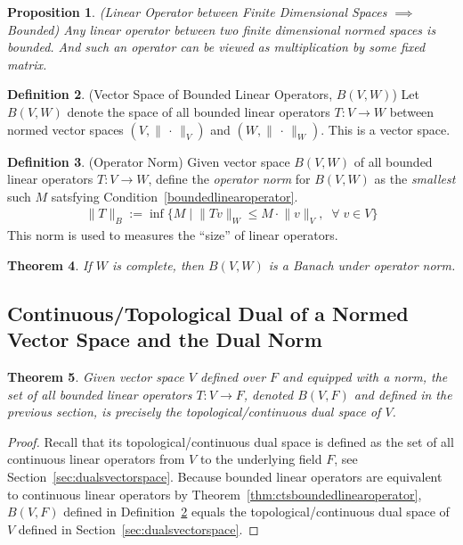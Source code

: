 \documentclass[12pt]{book}
\numberwithin{equation}{section} %
\theoremstyle{plain}
\newtheorem{thm}{Theorem}[section]
\newtheorem{prop}[thm]{Proposition}
\theoremstyle{definition}
\newtheorem{defn}[thm]{Definition}
\theoremstyle{remark}
\newcommand{\ra}{\rightarrow}
\begin{document}
\begin{prop}
\label{prop:finitedimbddlinearoperator}
\emph{(Linear Operator between Finite Dimensional Spaces $\implies$
Bounded)}
Any linear operator between two finite dimensional normed spaces
is bounded.
And such an operator can be viewed as multiplication by some fixed
matrix.
\end{prop}


\begin{defn}
\label{defn:BVW}
({Vector Space of Bounded Linear Operators, $B(V,W)$})
Let $B(V,W)$ denote the space of all bounded linear operators
$T:V\ra W$
between normed vector spaces
$(V,\lVert\,\cdot\,\rVert_V)$
and
$(W,\lVert\,\cdot\,\rVert_W)$.
This is a vector space.
\end{defn}


\begin{defn}(Operator Norm)
Given vector space $B(V,W)$ of all bounded linear operators $T:V\ra W$,
define the \emph{operator norm} for $B(V,W)$ as the \emph{smallest} such
$M$ satsfying Condition~\ref{boundedlinearoperator}.
\begin{align*}
  \lVert T\rVert_B
  :=
  \inf
  \big\{
    M
    \;\big|\;
    \lVert Tv\rVert_W
    \leq
    M
    \cdot
    \lVert v\rVert_V,
    \;\;
    \forall \; v\in V
  \big\}
\end{align*}
This norm is used to measures the ``size'' of linear operators.
\end{defn}


\begin{thm}
If $W$ is complete, then $B(V,W)$ is a Banach under operator norm.
\end{thm}


\clearpage
\subsection{%
  Continuous/Topological Dual of a Normed Vector Space and the Dual Norm
}
\label{sec:dualnormed}


\begin{thm}
Given vector space $V$ defined over $F$ and equipped with a norm,
the set of all bounded linear operators $T:V\ra F$, denoted $B(V,F)$ and
defined in the previous section, is precisely the topological/continuous
dual space of $V$.
\end{thm}
\begin{proof}
Recall that its topological/continuous dual space is defined as the set
of all continuous linear operators from $V$ to the underlying field $F$,
see Section~\ref{sec:dualsvectorspace}.
Because bounded linear operators are equivalent to continuous linear
operators by Theorem~\ref{thm:ctsboundedlinearoperator},
$B(V,F)$ defined in Definition~\ref{defn:BVW} equals the
topological/continuous dual space of $V$ defined in
Section~\ref{sec:dualsvectorspace}.
\end{proof}
\end{document}
